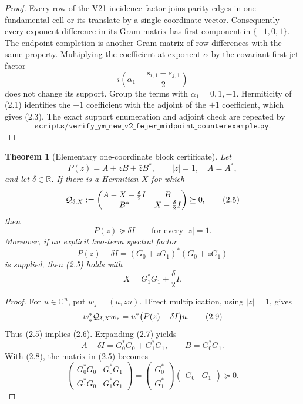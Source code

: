 \documentclass[11pt,oneside]{article}
\newtheorem{theorem}{Theorem}[section]
\theoremstyle{definition}
\theoremstyle{remark}
\begin{document}
\begin{proof}
Every row of the V21 incidence factor joins parity edges in one
fundamental cell or its translate by a single coordinate vector.
Consequently every exponent difference in its Gram matrix has first
component in \(\{-1,0,1\}\).  The endpoint completion is another
Gram matrix of row differences with the same property.  Multiplying
the coefficient at exponent \(\alpha\) by the covariant first-jet
factor
\[
 i\left(\alpha_1-\frac{s_{i,1}-s_{j,1}}2\right)           \tag{2.4}
\]
does not change its support.  Group the terms with
\(\alpha_1=0,1,-1\).  Hermiticity of (2.1) identifies the
\(-1\) coefficient with the adjoint of the \(+1\) coefficient,
which gives (2.3).  The exact support enumeration and adjoint check
are repeated by
\[
 \texttt{scripts/verify\_ym\_new\_v2\_fejer\_midpoint\_counterexample.py}.
\]
\end{proof}

\begin{theorem}[Elementary one-coordinate block certificate]
\label{thm:newv2-block}
Let
\[
 P(z)=A+zB+\bar zB^*,\qquad |z|=1,\quad A=A^*,
\]
and let \(\delta\in\mathbb R\).  If there is a Hermitian \(X\) for
which
\[
 {\cal Q}_{\delta,X}:=
 \begin{pmatrix}
 A-X-\frac{\delta}{2}I&B\\
 B^*&X-\frac{\delta}{2}I
 \end{pmatrix}\succeq0,                                  \tag{2.5}
\]
then
\[
 P(z)\succeq\delta I\qquad\text{for every }|z|=1.          \tag{2.6}
\]
Moreover, if an explicit two-term spectral factor
\[
 P(z)-\delta I=(G_0+zG_1)^*(G_0+zG_1)                    \tag{2.7}
\]
is supplied, then (2.5) holds with
\[
 X=G_1^*G_1+\frac{\delta}{2}I.                            \tag{2.8}
\]
\end{theorem}

\begin{proof}
For \(u\in\mathbb C^n\), put \(w_z=(u,zu)\).  Direct multiplication,
using \(|z|=1\), gives
\[
 w_z^*{\cal Q}_{\delta,X}w_z
 =u^*\bigl(P(z)-\delta I\bigr)u.                          \tag{2.9}
\]
Thus (2.5) implies (2.6).  Expanding (2.7) yields
\[
 A-\delta I=G_0^*G_0+G_1^*G_1,\qquad B=G_0^*G_1.         \tag{2.10}
\]
With (2.8), the matrix in (2.5) becomes
\[
 \begin{pmatrix}
 G_0^*G_0&G_0^*G_1\\
 G_1^*G_0&G_1^*G_1
 \end{pmatrix}
 =
 \begin{pmatrix}G_0^*\\G_1^*\end{pmatrix}
 \begin{pmatrix}G_0&G_1\end{pmatrix}\succeq0.             \tag{2.11}
\]
\end{proof}
\end{document}
